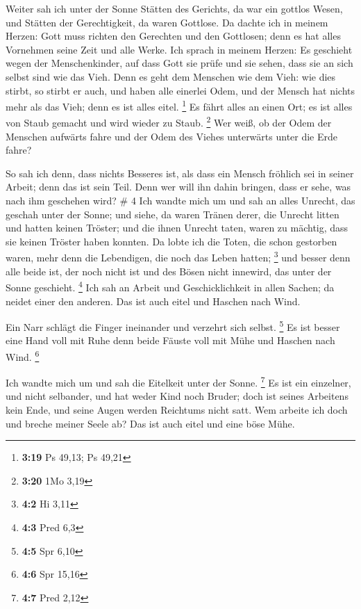  Weiter sah ich unter der Sonne Stätten des Gerichts, da
war ein gottlos Wesen, und Stätten der Gerechtigkeit, da waren Gottlose.
 Da dachte ich in meinem Herzen: Gott muss richten den
Gerechten und den Gottlosen; denn es hat alles Vornehmen seine Zeit und
alle Werke.  Ich sprach in meinem Herzen: Es geschieht
wegen der Menschenkinder, auf dass Gott sie prüfe und sie sehen, dass
sie an sich selbst sind wie das Vieh.  Denn es geht dem
Menschen wie dem Vieh: wie dies stirbt, so stirbt er auch, und haben
alle einerlei Odem, und der Mensch hat nichts mehr als das Vieh; denn es
ist alles eitel. \footnote{\textbf{3:19} Ps 49,13; Ps 49,21}
 Es fährt alles an einen Ort; es ist alles von Staub
gemacht und wird wieder zu Staub. \footnote{\textbf{3:20} 1Mo 3,19}
 Wer weiß, ob der Odem der Menschen aufwärts fahre und der
Odem des Viehes unterwärts unter die Erde fahre?

 So sah ich denn, dass nichts Besseres ist, als dass ein
Mensch fröhlich sei in seiner Arbeit; denn das ist sein Teil. Denn wer
will ihn dahin bringen, dass er sehe, was nach ihm geschehen wird? \# 4
 Ich wandte mich um und sah an alles Unrecht, das geschah
unter der Sonne; und siehe, da waren Tränen derer, die Unrecht litten
und hatten keinen Tröster; und die ihnen Unrecht taten, waren zu
mächtig, dass sie keinen Tröster haben konnten.  Da lobte
ich die Toten, die schon gestorben waren, mehr denn die Lebendigen, die
noch das Leben hatten; \footnote{\textbf{4:2} Hi 3,11}  und
besser denn alle beide ist, der noch nicht ist und des Bösen nicht
innewird, das unter der Sonne geschieht. \footnote{\textbf{4:3} Pred 6,3}
 Ich sah an Arbeit und Geschicklichkeit in allen Sachen; da
neidet einer den anderen. Das ist auch eitel und Haschen nach Wind.

 Ein Narr schlägt die Finger ineinander und verzehrt sich
selbst. \footnote{\textbf{4:5} Spr 6,10}  Es ist besser eine
Hand voll mit Ruhe denn beide Fäuste voll mit Mühe und Haschen nach
Wind. \footnote{\textbf{4:6} Spr 15,16}

 Ich wandte mich um und sah die Eitelkeit unter der Sonne.
\footnote{\textbf{4:7} Pred 2,12}  Es ist ein einzelner, und
nicht selbander, und hat weder Kind noch Bruder; doch ist seines
Arbeitens kein Ende, und seine Augen werden Reichtums nicht satt. Wem
arbeite ich doch und breche meiner Seele ab? Das ist auch eitel und eine
böse Mühe.

